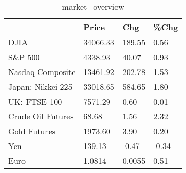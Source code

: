 \documentclass{article}%
\begin{document}
%


\begin{table}[htbp]%
\caption{market\_overview}%
\centering%
\begin{adjustbox}{width=1\textwidth}%
\begin{tabular}{llll}
\toprule
                  &    Price &    Chg &  \%Chg \\
\midrule
             DJIA & 34066.33 & 189.55 &  0.56 \\
          S\&P 500 &  4338.93 &  40.07 &  0.93 \\
 Nasdaq Composite & 13461.92 & 202.78 &  1.53 \\
Japan: Nikkei 225 & 33018.65 & 584.65 &  1.80 \\
     UK: FTSE 100 &  7571.29 &   0.60 &  0.01 \\
Crude Oil Futures &    68.68 &   1.56 &  2.32 \\
     Gold Futures &  1973.60 &   3.90 &  0.20 \\
              Yen &   139.13 &  -0.47 & -0.34 \\
             Euro &   1.0814 & 0.0055 &  0.51 \\
\bottomrule
\end{tabular}
%
\end{adjustbox}%
\end{table}

%
\end{document}
